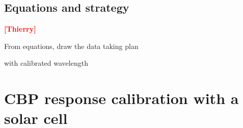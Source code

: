 \documentclass[printer]{aa}
\newcommand{\todo}[1]{\textbf{\textcolor{red}{[#1]}}\xspace}
\begin{document}
%  
%
%
%
%  
%  

\subsection{Equations and strategy}

\todo{Thierry}

From equations, draw the data taking plan

with calibrated wavelength

\section{CBP response calibration with a solar cell}
\end{document}
